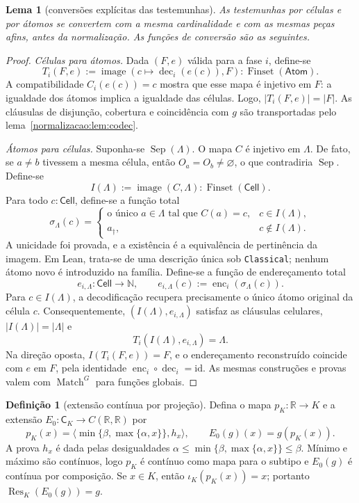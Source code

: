 \documentclass[12pt,a4paper]{article}
\theoremstyle{preciso}
\newtheorem{lema}[teorema]{Lema}
\theoremstyle{definition}
\newtheorem{definicao}[teorema]{Definição}
\newcommand{\N}{\mathbb N}
\newcommand{\R}{\mathbb R}
\newcommand{\Atoms}{\mathsf{Atom}}
\newcommand{\Cell}{\mathsf{Cell}}
\newcommand{\CK}{\mathsf C_K}
\newcommand{\FS}{\operatorname{Finset}}
\newcommand{\Sep}{\operatorname{Sep}}
\newcommand{\Match}{\operatorname{Match}}
\newcommand{\Res}{\operatorname{Res}}
\newcommand{\dec}{\operatorname{dec}}
\newcommand{\enc}{\operatorname{enc}}
\newcommand{\code}[1]{\nolinkurl{#1}}
\theoremstyle{preciso}
\theoremstyle{preciso}
\theoremstyle{preciso}
\theoremstyle{preciso}
\theoremstyle{definition}
\theoremstyle{preciso}
\theoremstyle{definition}
\theoremstyle{preciso}
\theoremstyle{preciso}
\theoremstyle{definition}
\begin{document}
\begin{lema}[conversões explícitas das testemunhas]\label{map:normalizacao:5.4}\label{normalizacao:lem:witnesses}
As testemunhas por células e por átomos se convertem com a mesma
cardinalidade e com as mesmas peças afins, antes da normalização.
As funções de conversão são as seguintes.
\end{lema}
\begin{proof}
\emph{Células para átomos.} Dada $(F,e)$ válida para a fase $i$,
define-se
\[
 T_i(F,e):=\operatorname{image}
             (c\mapsto\dec_i(e(c)),F):\FS(\Atoms).
\]
A compatibilidade $C_i(e(c))=c$ mostra que esse mapa é injetivo em
$F$: a igualdade dos átomos implica a igualdade das células.
Logo, $|T_i(F,e)|=|F|$. As cláusulas de disjunção, cobertura e
coincidência com $g$ são transportadas pelo lema~\ref{normalizacao:lem:codec}.

\emph{Átomos para células.} Suponha-se $\Sep(\Lambda)$. O mapa
$C$ é injetivo em $\Lambda$. De fato, se $a\ne b$ tivessem a
mesma célula, então $O_a=O_b\ne\varnothing$, o que contradiria
$\Sep$. Define-se
\[
 I(\Lambda):=\operatorname{image}(C,\Lambda):\FS(\Cell).
\]
Para todo $c:\Cell$, define-se a função total
\[
 \sigma_\Lambda(c)=
 \begin{cases}
 \text{o único }a\in\Lambda\text{ tal que }C(a)=c,
                                      &c\in I(\Lambda),\\
 a_\dagger,                            &c\notin I(\Lambda).
 \end{cases}
\]
A unicidade foi provada, e a existência é a equivalência de
pertinência da imagem. Em Lean, trata-se de uma descrição única sob
\code{Classical}; nenhum átomo novo é introduzido na família.
Define-se a função de endereçamento total
\[
 e_{i,\Lambda}:\Cell\to\N,\qquad
 e_{i,\Lambda}(c):=\enc_i(\sigma_\Lambda(c)).
\]
Para $c\in I(\Lambda)$, a decodificação recupera precisamente o
único átomo original da célula $c$. Consequentemente,
$(I(\Lambda),e_{i,\Lambda})$ satisfaz as cláusulas celulares,
$|I(\Lambda)|=|\Lambda|$ e
\[
 T_i(I(\Lambda),e_{i,\Lambda})=\Lambda.
\]
Na direção oposta, $I(T_i(F,e))=F$, e o endereçamento reconstruído
coincide com $e$ em $F$, pela identidade $\enc_i\circ\dec_i=\mathrm{id}$.
As mesmas construções e provas valem com $\Match^G$ para funções globais.
\end{proof}

\begin{definicao}[extensão contínua por projeção]\label{map:normalizacao:5.5}\label{normalizacao:def:clamp}
Defina o mapa $p_K:\R\to K$ e a extensão $E_0:\CK\to C(\R,\R)$ por
\[
 p_K(x)=\langle\min\{\beta,\max\{\alpha,x\}\},h_x\rangle,
 \qquad E_0(g)(x)=g(p_K(x)).
\]
A prova $h_x$ é dada pelas desigualdades
$\alpha\le\min\{\beta,\max\{\alpha,x\}\}\le\beta$.
Mínimo e máximo são contínuos, logo $p_K$ é contínuo como mapa
para o subtipo e $E_0(g)$ é contínua por composição.
Se $x\in K$, então $\iota_K(p_K(x))=x$; portanto
$\Res_K(E_0(g))=g$.
\end{definicao}
\end{document}
